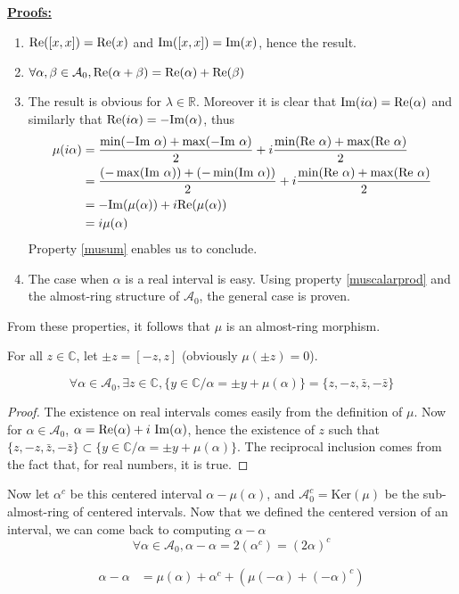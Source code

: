 \noindent\underline{\textbf{Proofs:}}
\begin{enumerate}[i]
    \item $\mathrm{Re}([x, x]) = \mathrm{Re}(x)$ and $\mathrm{Im}([x, x]) = \mathrm{Im}(x)$, hence the result.
    \item $\forall \alpha, \beta \in \mathcal{A}_0, \mathrm{Re}(\alpha + \beta) = \mathrm{Re}(\alpha) + \mathrm{Re}(\beta)$
    \item The result is obvious for $\lambda \in \mathbb{R}$.
    Moreover it is clear that $\mathrm{Im}(i \alpha) = \mathrm{Re}(\alpha)$ and similarly that $\mathrm{Re}(i \alpha) = - \mathrm{Im}(\alpha)$, thus
    \begin{align*}
        \mu(i\alpha) &= \frac{\min(-\mathrm{Im}~\alpha) + \max(-\mathrm{Im}~\alpha)}{2} + i \frac{\min(\mathrm{Re}~\alpha) + \max(\mathrm{Re}~\alpha)}{2} \\
        &= \frac{(-\max(\mathrm{Im}~\alpha)) + (-\min(\mathrm{Im}~\alpha))}{2} + i \frac{\min(\mathrm{Re}~\alpha) + \max(\mathrm{Re}~\alpha)}{2} \\
        &= - \mathrm{Im}(\mu(\alpha)) + i \mathrm{Re}(\mu(\alpha)) \\
        &= i \mu(\alpha)
    \end{align*}
    Property \ref{musum} enables us to conclude.
    \item The case when $\alpha$ is a real interval is easy. Using property \ref{muscalarprod} and the almost-ring structure of $\mathcal{A}_0$, the general case is proven.
    \hfill{} $\boxed{}$
\end{enumerate}

\noindent From these properties, it follows that $\mu$ is an almost-ring morphism.

For all $z \in \mathbb{C}$, let $\pm z = [-z, z]$ (obviously $\mu(\pm z) = 0$).
\begin{theorem}
    $$\forall \alpha \in \mathcal{A}_0, \exists z \in \mathbb{C}, \{y \in \mathbb{C} / \alpha = \pm y + \mu(\alpha)\} = \{z, -z, \bar{z}, -\bar z\}$$
\end{theorem}
\begin{proof}
    The existence on real intervals comes easily from the definition of $\mu$.
    Now for $\alpha \in \mathcal{A}_0$, $\alpha = \mathrm{Re}(\alpha) + i~\mathrm{Im}(\alpha)$, hence the existence of $z$ such that $\{z, -z, \bar{z}, -\bar z\} \subset \{y \in \mathbb{C} / \alpha = \pm y + \mu(\alpha)\}$.
    The reciprocal inclusion comes from the fact that, for real numbers, it is true.
\end{proof}

Now let $\alpha^c$ be this centered interval $\alpha - \mu(\alpha)$, and $\mathcal{A}_0^c = \text{Ker}(\mu)$ be the sub-almost-ring of centered intervals. Now that we defined the centered version of an interval, we can come back to computing $\alpha - \alpha$
$$\forall \alpha \in \mathcal{A}_0, \alpha - \alpha = 2(\alpha^c) = (2\alpha)^c$$

\begin{align*}
\alpha - \alpha
&= \mu(\alpha) + \alpha^c + (\mu(-\alpha) + (-\alpha)^c)\\
\end{align*}
